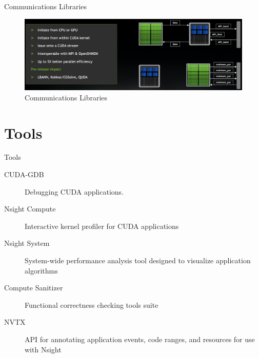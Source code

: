 \documentclass[aspectratio=169]{beamer}
\begin{document}
\begin{frame}{Communications Libraries}
\begin{figure}
  \includegraphics[width=\linewidth]{figures/shmem.png}
  \caption{Communications Libraries}
\end{figure}
\end{frame}

\section{Tools}

\begin{frame}{Tools}
\begin{description}
  \item[CUDA-GDB] Debugging CUDA applications.
  \item[Nsight Compute] Interactive kernel profiler for CUDA applications
  \item[Nsight System] System-wide performance analysis tool designed to visualize application algorithms
  \item[Compute Sanitizer] Functional correctness checking tools suite
  \item[NVTX] API for annotating application events, code ranges, and resources for use with Nsight
\end{description}
\end{frame}


\end{document}
